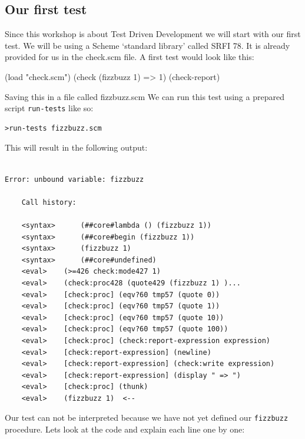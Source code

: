 \documentclass[12pt,a4paper,english,twoside]{article}
\begin{document}
\subsection{Our first test}
Since this workshop is about Test Driven Development we will start with our 
first test. We will be using a Scheme `standard library' called SRFI 78. It is 
already provided for us in the check.scm file. A first test would look like 
this:
\begin{schemecode}
(load "check.scm")
(check (fizzbuzz 1) => 1)
(check-report)
\end{schemecode}
Saving this in a file called fizzbuzz.scm We can run this test using a 
prepared script \texttt{run-tests} like so:
\begin{lstlisting}
>run-tests fizzbuzz.scm
\end{lstlisting}
This will result in the following output:
\begin{lstlisting}

Error: unbound variable: fizzbuzz

    Call history:

    <syntax>	  (##core#lambda () (fizzbuzz 1))
    <syntax>	  (##core#begin (fizzbuzz 1))
    <syntax>	  (fizzbuzz 1)
    <syntax>	  (##core#undefined)
    <eval>	  (>=426 check:mode427 1)
    <eval>	  (check:proc428 (quote429 (fizzbuzz 1) )...
    <eval>	  [check:proc] (eqv?60 tmp57 (quote 0))
    <eval>	  [check:proc] (eqv?60 tmp57 (quote 1))
    <eval>	  [check:proc] (eqv?60 tmp57 (quote 10))
    <eval>	  [check:proc] (eqv?60 tmp57 (quote 100))
    <eval>	  [check:proc] (check:report-expression expression)
    <eval>	  [check:report-expression] (newline)
    <eval>	  [check:report-expression] (check:write expression)
    <eval>	  [check:report-expression] (display " => ")
    <eval>	  [check:proc] (thunk)
    <eval>	  (fizzbuzz 1)	<--
\end{lstlisting}
Our test can not be interpreted because we have not yet defined our 
\texttt{fizzbuzz} procedure. Lets look at the code and explain each line 
one by one:
\end{document}
